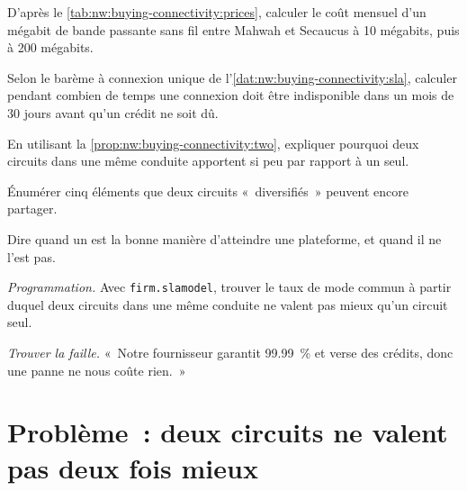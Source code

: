 \begin{exercise}[$\star$]\label{exo:nw:buying-connectivity:2}
D'après le \cref{tab:nw:buying-connectivity:prices}, calculer le coût mensuel d'un mégabit de bande passante sans fil entre Mahwah et Secaucus à 10 mégabits, puis à 200
mégabits.
\end{exercise}

\begin{exercise}[$\star$]\label{exo:nw:buying-connectivity:3}
Selon le barème à connexion unique de l'\cref{dat:nw:buying-connectivity:sla}, calculer pendant combien de temps une connexion doit être indisponible dans un mois de 30 jours avant
qu'un crédit ne soit dû.
\end{exercise}

\begin{exercise}[$\star\star$]\label{exo:nw:buying-connectivity:4}
En utilisant la \cref{prop:nw:buying-connectivity:two}, expliquer pourquoi deux circuits dans une même conduite apportent si peu par rapport à un seul.
\end{exercise}

\begin{exercise}[$\star\star$]\label{exo:nw:buying-connectivity:5}
Énumérer cinq éléments que deux circuits «~diversifiés~» peuvent encore partager.
\end{exercise}

\begin{exercise}[$\star\star$]\label{exo:nw:buying-connectivity:6}
Dire quand un  est la bonne manière d'atteindre une plateforme, et quand il ne l'est pas.
\end{exercise}

\begin{exercise}[$\star\star\star$]\label{exo:nw:buying-connectivity:7}
\emph{Programmation.} Avec \texttt{firm.slamodel}, trouver le taux de mode commun à partir duquel deux circuits dans une même conduite ne valent pas mieux qu'un circuit seul.
\end{exercise}

\begin{exercise}[$\star\star\star$]\label{exo:nw:buying-connectivity:8}
\emph{Trouver la faille.} «~Notre fournisseur garantit 99.99~\% et verse des crédits, donc une panne ne nous coûte rien.~»
\end{exercise}

\section{Problème~: deux circuits ne valent pas deux fois mieux}

